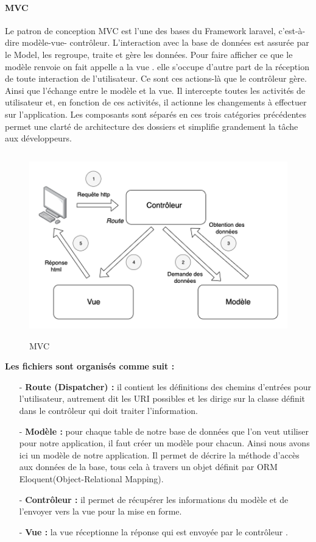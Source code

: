 \paragraph{MVC}
Le patron de conception MVC est l’une des bases du Framework
laravel, c’est-à-dire modèle-vue- contrôleur. L’interaction avec la
base de données est assurée par le Model, les regroupe, traite et
gère les données.
Pour faire afficher ce que le modèle renvoie on fait appelle a la vue .
elle s’occupe d’autre part de la réception de toute interaction de
l’utilisateur. Ce sont ces actions-là que le contrôleur gère.
Ainsi que l’échange entre le modèle et la vue. Il intercepte toutes les
activités de utilisateur et, en fonction de ces activités, il actionne les
changements à effectuer sur l'application.
Les composants sont séparés en ces trois catégories précédentes
permet une clarté de architecture des dossiers et simplifie
grandement la tâche aux développeurs.
\begin{figure}[h!]
	\includegraphics[width=15cm, height=8cm]{./Template LaTeX/Images/Modèle-vue-contrôleur_(MVC)_-_fr.png}
	\caption{MVC}
	\label{fig:birds}
\end{figure}
\newline \newline \newline
\textbf{Les fichiers sont organisés comme suit :}
\begin{enumerate}
	\item [-] \textbf{Route (Dispatcher) : }il contient les définitions des chemins d’entrées pour l’utilisateur,
	autrement dit les URI possibles et les dirige sur la classe définit dans
	le contrôleur qui doit traiter l’information.
	\item [-] \textbf{ Modèle : }pour chaque table de notre base de données que l’on veut
	utiliser pour notre application, il faut créer un modèle pour chacun.
	Ainsi nous avons ici un modèle de notre application. Il permet de
	décrire la méthode d’accès aux données de la base, tous cela à
	travers un objet définit par ORM Eloquent(Object-Relational
	Mapping).
	\item [-] \textbf{Contrôleur : } il permet de récupérer les informations du modèle et de l’envoyer
	vers la vue pour la mise en forme.
	\item [-] \textbf{Vue : } la vue réceptionne la réponse qui est envoyée par le
	contrôleur .\newline
\end{enumerate}
